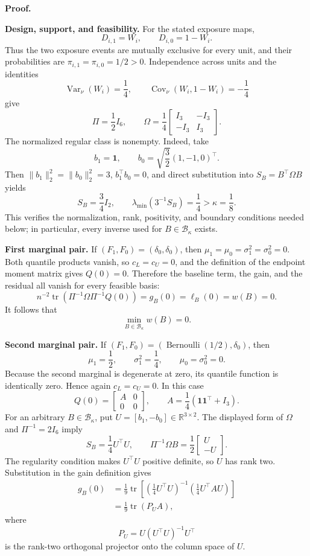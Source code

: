 \textbf{Proof.}

\textbf{Design, support, and feasibility.}
For the stated exposure maps,
\[
D_{i,1}=W_i,
\qquad
D_{i,0}=1-W_i.
\]
Thus the two exposure events are mutually exclusive for every unit, and their probabilities are \(\pi_{i,1}=\pi_{i,0}=1/2>0\).  Independence across units and the identities
\[
\operatorname{Var}_{\nu}(W_i)=\frac14,
\qquad
\operatorname{Cov}_{\nu}(W_i,1-W_i)=-\frac14
\]
give
\[
\Pi=\frac12 I_6,
\qquad
\Omega=\frac14
\begin{bmatrix}
I_3&-I_3\\
-I_3&I_3
\end{bmatrix}.
\]
The normalized regular class is nonempty.  Indeed, take
\[
b_1=\mathbf 1,
\qquad
b_0=\sqrt{\frac32}(1,-1,0)^{\top}.
\]
Then \(\lVert b_1\rVert_2^2=\lVert b_0\rVert_2^2=3\), \(b_1^{\top}b_0=0\), and direct substitution into \(S_B=B^{\top}\Omega B\) yields
\[
S_B=\frac34 I_2,
\qquad
\lambda_{\min}(3^{-1}S_B)=\frac14>\kappa=\frac18.
\]
This verifies the normalization, rank, positivity, and boundary conditions needed below; in particular, every inverse used for \(B\in\mathcal B_\kappa\) exists.

\textbf{First marginal pair.}
If \((F_1,F_0)=(\delta_0,\delta_0)\), then \(\mu_1=\mu_0=\sigma_1^2=\sigma_0^2=0\).  Both quantile products vanish, so \(c_L=c_U=0\), and the definition of the endpoint moment matrix gives \(Q(0)=0\).  Therefore the baseline term, the gain, and the residual all vanish for every feasible basis:
\[
n^{-2}\operatorname{tr}\!\left(\Pi^{-1}\Omega\Pi^{-1}Q(0)\right)
=g_B(0)=\ell_B(0)=w(B)=0.
\]
It follows that
\[
\min_{B\in\mathcal B_\kappa}w(B)=0.
\]

\textbf{Second marginal pair.}
If \((F_1,F_0)=(\operatorname{Bernoulli}(1/2),\delta_0)\), then
\[
\mu_1=\frac12,
\qquad
\sigma_1^2=\frac14,
\qquad
\mu_0=\sigma_0^2=0.
\]
Because the second marginal is degenerate at zero, its quantile function is identically zero.  Hence again \(c_L=c_U=0\).  In this case
\[
Q(0)=
\begin{bmatrix}
A&0\\
0&0
\end{bmatrix},
\qquad
A=\frac14\left(\mathbf 1\mathbf 1^{\top}+I_3\right).
\]
For an arbitrary \(B\in\mathcal B_\kappa\), put \(U=[b_1,-b_0]\in\mathbb R^{3\times2}\).  The displayed form of \(\Omega\) and \(\Pi^{-1}=2I_6\) imply
\[
S_B=\frac14U^{\top}U,
\qquad
\Pi^{-1}\Omega B=\frac12
\begin{bmatrix}
U\\
-U
\end{bmatrix}.
\]
The regularity condition makes \(U^{\top}U\) positive definite, so \(U\) has rank two.  Substitution in the gain definition gives
\[
\begin{aligned}
g_B(0)
&=\frac1{9}\operatorname{tr}\!\left[
\left(\frac14U^{\top}U\right)^{-1}
\left(\frac14U^{\top}AU\right)
\right]\\
&=\frac1{9}\operatorname{tr}(P_UA),
\end{aligned}
\]
where
\[
P_U=U(U^{\top}U)^{-1}U^{\top}
\]
is the rank-two orthogonal projector onto the column space of \(U\).

